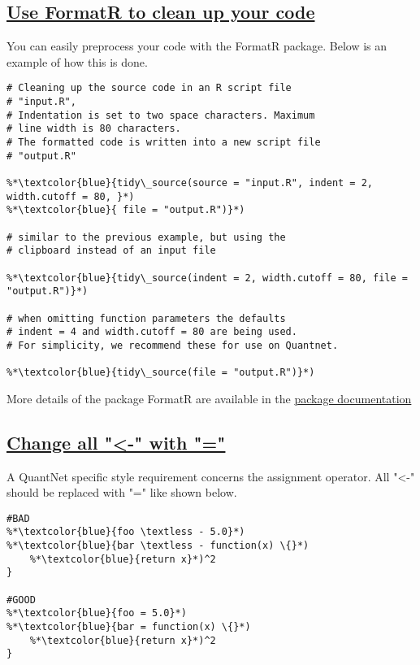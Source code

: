 \documentclass{article}
\begin{document}
\subsection{\label{formatR} \hyperref[formatR-ini]{Use FormatR to clean up your code}}
You can easily preprocess your code with the FormatR package. Below is an example of how this is done.
\begin{lstlisting}[frame=single]
# Cleaning up the source code in an R script file 
# "input.R", 
# Indentation is set to two space characters. Maximum 
# line width is 80 characters. 
# The formatted code is written into a new script file 
# "output.R"

%*\textcolor{blue}{tidy\_source(source = "input.R", indent = 2, width.cutoff = 80, }*)
%*\textcolor{blue}{ file = "output.R")}*)

# similar to the previous example, but using the 
# clipboard instead of an input file

%*\textcolor{blue}{tidy\_source(indent = 2, width.cutoff = 80, file = "output.R")}*)

# when omitting function parameters the defaults 
# indent = 4 and width.cutoff = 80 are being used. 
# For simplicity, we recommend these for use on Quantnet.

%*\textcolor{blue}{tidy\_source(file = "output.R")}*)

\end{lstlisting}
More details of the package FormatR are available in the  \href{https://cran.r-project.org/web/packages/formatR/formatR.pdf}{package documentation}

\subsection{\label{all-equal}\hyperref[all-equal-ini]{Change all "\textless-" with "="}}
A QuantNet specific style requirement concerns the assignment operator. All "\textless -" should be replaced with "=" like shown below.
\begin{lstlisting}[frame=single]
#BAD
%*\textcolor{blue}{foo \textless - 5.0}*)
%*\textcolor{blue}{bar \textless - function(x) \{}*)
	%*\textcolor{blue}{return x}*)^2
}

#GOOD
%*\textcolor{blue}{foo = 5.0}*)
%*\textcolor{blue}{bar = function(x) \{}*)
	%*\textcolor{blue}{return x}*)^2
}

\end{lstlisting}
\end{document}
